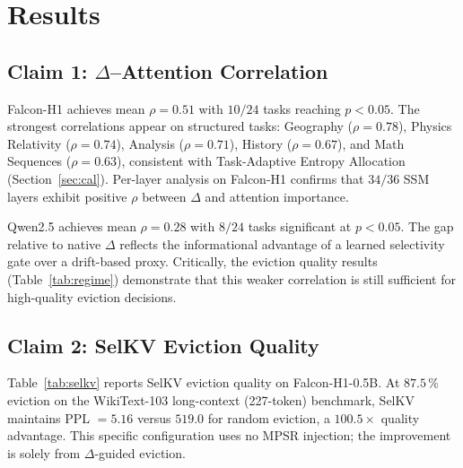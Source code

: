 \documentclass[11pt]{article}
\newcommand{\dsig}{\Delta}
\begin{document}
\section{Results}

\subsection{Claim 1: $\dsig$--Attention Correlation}
Falcon-H1 achieves mean $\rho{=}0.51$ with $10/24$ tasks reaching $p<0.05$.
The strongest correlations appear on structured tasks: Geography
($\rho{=}0.78$), Physics Relativity ($\rho{=}0.74$), Analysis
($\rho{=}0.71$), History ($\rho{=}0.67$), and Math Sequences ($\rho{=}0.63$),
consistent with Task-Adaptive Entropy Allocation (Section~\ref{sec:cal}).
Per-layer analysis on Falcon-H1 confirms that $34/36$ SSM layers exhibit
positive $\rho$ between $\dsig$ and attention importance.

Qwen2.5 achieves mean $\rho{=}0.28$ with $8/24$ tasks significant at
$p<0.05$. The gap relative to native $\dsig$ reflects the informational
advantage of a learned selectivity gate over a drift-based proxy.
Critically, the eviction quality results (Table~\ref{tab:regime}) demonstrate
that this weaker correlation is still sufficient for high-quality eviction
decisions.

\subsection{Claim 2: SelKV Eviction Quality}
Table~\ref{tab:selkv} reports SelKV eviction quality on Falcon-H1-0.5B. At
$87.5\,\%$ eviction on the WikiText-103 long-context (227-token) benchmark,
SelKV maintains PPL $=5.16$ versus $519.0$ for random eviction, a
$100.5\!\times$ quality advantage. This specific configuration uses no MPSR
injection; the improvement is solely from $\dsig$-guided eviction.
\end{document}
